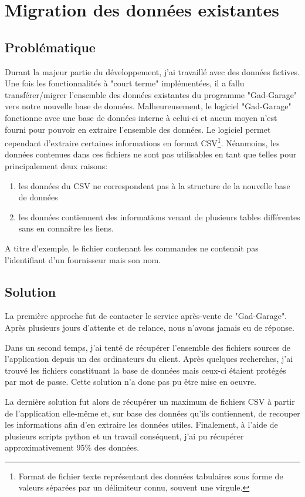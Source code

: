 \section{Migration des données existantes}
\subsection{Problématique}

Durant la majeur partie du développement, j'ai travaillé avec des données fictives. Une fois les fonctionnalités à "court terme" implémentées, il a fallu transférer/migrer l'ensemble des données existantes du programme "Gad-Garage" vers notre nouvelle base de données. Malheureusement, le logiciel "Gad-Garage" fonctionne avec une base de données interne à celui-ci et aucun moyen n'est fourni pour pouvoir en extraire l'ensemble des données. Le logiciel permet cependant d'extraire certaines informations en format CSV\footnote{Format de fichier texte représentant des données tabulaires sous forme de valeurs séparées par un délimiteur connu, souvent une virgule.}. Néanmoins, les données contenues dans ces fichiers ne sont pas utilisables en tant que telles pour principalement deux raisons: 
\begin{enumerate}
  \item les données du CSV ne correspondent pas à la structure de la nouvelle base de données
  \item les données contiennent des informations venant de plusieurs tables différentes sans en connaître les liens.
\end{enumerate}
A titre d'exemple, le fichier contenant les commandes ne contenait pas l'identifiant d'un fournisseur mais son nom.

\subsection{Solution}

La première approche fut de contacter le service après-vente de "Gad-Garage". Après plusieurs jours d'attente et de relance, nous n'avons jamais eu de réponse. 

\newpara

Dans un second temps, j'ai tenté de récupérer l'ensemble des fichiers sources de l'application depuis un des ordinateurs du client. Après quelques recherches, j'ai trouvé les fichiers constituant la base de données mais ceux-ci étaient protégés par mot de passe. Cette solution n'a donc pas pu être mise en oeuvre.

\newpara

La dernière solution fut alors de récupérer un maximum de fichiers CSV à partir de l'application elle-même et, sur base des données qu'ils contiennent, de recouper les informations afin d'en extraire les données utiles. Finalement, à l'aide de plusieurs scripts python et un travail conséquent, j'ai pu récupérer approximativement 95\% des données.